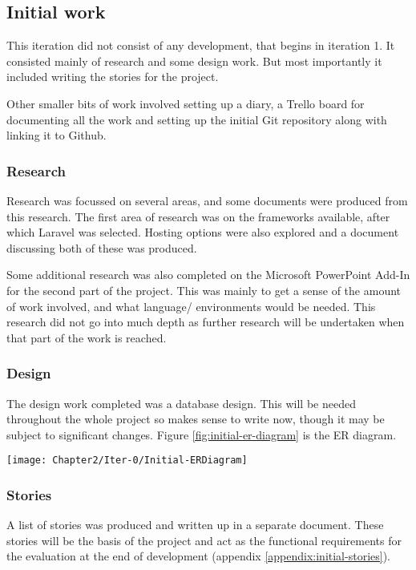 \subsection{Initial work}
This iteration did not consist of any development, that begins in iteration 1. It consisted mainly of research and some design work. But most importantly it included writing the stories for the project. 

Other smaller bits of work involved setting up a diary, a Trello board for documenting all the work and setting up the initial Git repository along with linking it to Github.
\subsubsection{Research}
Research was focussed on several areas, and some documents were produced from this research. The first area of research was on the frameworks available, after which Laravel was selected. Hosting options were also explored and a document discussing both of these was produced.

Some additional research was also completed on the Microsoft PowerPoint Add-In for the second part of the project. This was mainly to get a sense of the amount of work involved, and what language/ environments would be needed. This research did not go into much depth as further research will be undertaken when that part of the work is reached.
\subsubsection{Design}
The design work completed was a database design. This will be needed throughout the whole project so makes sense to write now, though it may be subject to significant changes. Figure \ref{fig:initial-er-diagram} is the ER diagram.

\begin{sidewaysfigure}
	\caption{Entity relationship digram for the initial database}
	\texttt{[image: Chapter2/Iter-0/Initial-ERDiagram]}
	\label{fig:initial-er-diagram}
\end{sidewaysfigure}

\subsubsection{Stories}
A list of stories was produced and written up in a separate document. These stories will be the basis of the project and act as the functional requirements for the evaluation at the end of development (appendix \ref{appendix:initial-stories}).
\newpage